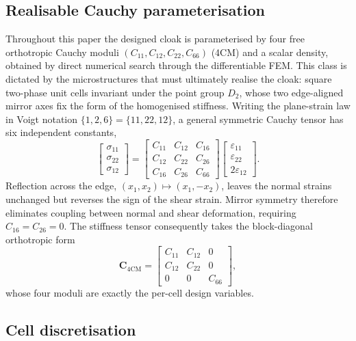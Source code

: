 \documentclass[preprint,12pt]{elsarticle}
\newcommand{\mbf}[1]{\mathbf{#1}}
\newcommand{\be}{\begin{equation}}
\newcommand{\ee}{\end{equation}}
\begin{document}
\subsection{Realisable Cauchy parameterisation}\label{subsec:flat4}

Throughout this paper the designed cloak is parameterised by four free
orthotropic Cauchy moduli $(C_{11},C_{12},C_{22},C_{66})$ (4CM) and a
scalar density, obtained by direct numerical search through the
differentiable FEM. This class is dictated by the microstructures that
must ultimately realise the cloak: square
two-phase unit cells invariant under the point group $D_2$, whose two
edge-aligned mirror axes fix the form of the homogenised stiffness.
Writing the plane-strain law in Voigt notation $\{1,2,6\}=\{11,22,12\}$,
a general symmetric Cauchy tensor has six independent constants,
\be\label{eq:cauchy_general}
  \begin{bmatrix}\sigma_{11}\\ \sigma_{22}\\ \sigma_{12}\end{bmatrix}
  =
  \begin{bmatrix}
    C_{11} & C_{12} & C_{16}\\
    C_{12} & C_{22} & C_{26}\\
    C_{16} & C_{26} & C_{66}
  \end{bmatrix}
  \begin{bmatrix}\varepsilon_{11}\\ \varepsilon_{22}\\ 2\varepsilon_{12}\end{bmatrix}.
\ee
Reflection across the edge, $(x_1,x_2)\mapsto(x_1,-x_2)$, leaves the normal strains unchanged
but reverses the sign of the shear strain. Mirror symmetry therefore eliminates
coupling between normal and shear deformation, requiring $C_{16}=C_{26}=0$.
The stiffness tensor consequently takes the block-diagonal orthotropic form
\be\label{eq:4cm}
  \mbf{C}_{\mathrm{4CM}}
  =
  \begin{bmatrix}
    C_{11} & C_{12} & 0\\
    C_{12} & C_{22} & 0\\
    0 & 0 & C_{66}
  \end{bmatrix},
\ee
whose four moduli are exactly the per-cell design variables. 

\subsection{Cell discretisation}
\end{document}
